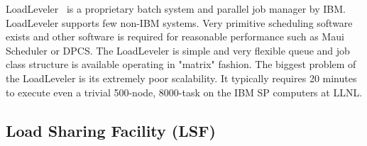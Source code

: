 LoadLeveler~\cite{LoadLevelerManual,LoadLevelerWeb} 
is a proprietary batch system and parallel job manager by 
IBM. LoadLeveler supports few non-IBM systems. Very primitive 
scheduling software exists and other software is required for reasonable 
performance such as Maui Scheduler or DPCS. 
The LoadLeveler is simple and very flexible queue and job class structure is available 
operating in "matrix" fashion. 
The biggest problem of the LoadLeveler is its extremely poor scalability. 
It typically requires 20 minutes to execute even a trivial 500-node, 8000-task
on the IBM SP computers at LLNL.
%
%
%
%
\subsection*{Load Sharing Facility (LSF)}


